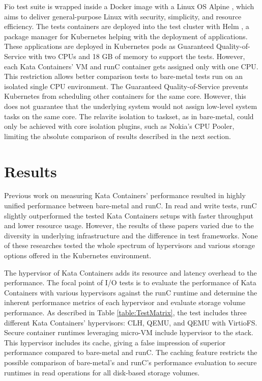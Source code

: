 Fio test suite is wrapped inside a Docker image with a Linux OS Alpine \cite{Alpine}, which aims to deliver general-purpose Linux with security, simplicity, and resource efficiency. The tests containers are deployed into the test cluster with Helm \cite{Helm}, a package manager for Kubernetes helping with the deployment of applications. These applications are deployed in Kubernetes pods as Guaranteed Quality-of-Service \cite{QOSKubernetes} with two CPUs and 18 GB of memory to support the tests. However, each Kata Containers' VM and runC container gets assigned only with one CPU. This restriction allows better comparison tests to bare-metal tests run on an isolated single CPU environment. The Guaranteed Quality-of-Service prevents Kubernetes from scheduling other containers for the same core. However, this does not guarantee that the underlying system would not assign low-level system tasks on the same core. The relavite isolation to taskset, as in bare-metal, could only be achieved with core isolation plugins, such as Nokia's CPU Pooler, limiting the absolute comparison of results described in the next section.

\section{Results}

Previous work \cite{EverartsdeVelp2020}\cite{Kumar2020}\cite{StackHPCKata}\cite{Randazzo2019} on measuring Kata Containers' performance resulted in highly unified performance between bare-metal and runC. In read and write tests, runC slightly outperformed the tested Kata Containers setups with faster throughput and lower resource usage. However, the results of these papers varied due to the diversity in underlying infrastructure and the difference in test frameworks. None of these researches tested the whole spectrum of hypervisors and various storage options offered in the Kubernetes environment.

The hypervisor of Kata Containers adds its resource and latency overhead to the performance. The focal point of I/O tests is to evaluate the performance of Kata Containers with various hypervisors against the runC runtime and determine the inherent performance metrics of each hypervisor and evaluate storage volume performance. As described in Table \ref{table:TestMatrix}, the test includes three different Kata Containers' hypervisors: CLH, QEMU, and QEMU with VirtioFS. Secure container runtimes leveraging micro-VM include hypervisor to the stack. This hypervisor includes its cache, giving a false impression of superior performance compared to bare-metal and runC. The caching feature restricts the possible comparison of bare-metal's and runC's performance evaluation to secure runtimes in read operations for all disk-based storage volumes.

